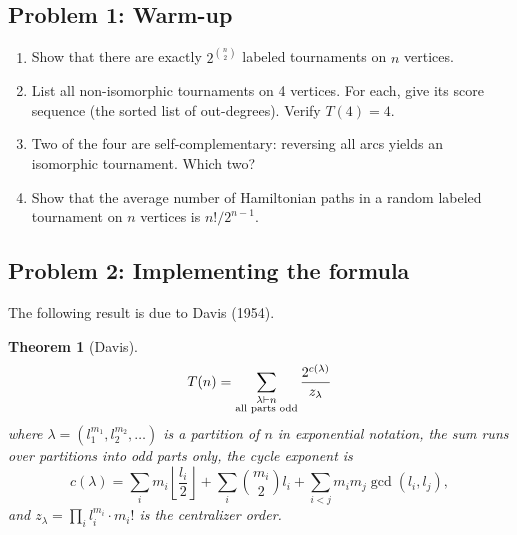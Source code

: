 \documentclass[11pt,letterpaper]{article}
\newtheorem{theorem}{Theorem}
\theoremstyle{definition}
\begin{document}
\subsection*{Problem 1: Warm-up \hfill \normalfont [15 points]}

\begin{enumerate}[label=(\alph*)]
  \item Show that there are exactly $2^{\binom{n}{2}}$ labeled tournaments on $n$ vertices.
  \item List all non-isomorphic tournaments on 4 vertices. For each, give its score sequence (the sorted list of out-degrees). Verify $T(4) = 4$.
  \item Two of the four are self-complementary: reversing all arcs yields an isomorphic tournament. Which two?
  \item Show that the average number of Hamiltonian paths in a random labeled tournament on $n$ vertices is $n!/2^{n-1}$.
\end{enumerate}

\bigskip


\subsection*{Problem 2: Implementing the formula \hfill \normalfont [25 points]}

The following result is due to Davis (1954).

\begin{theorem}[Davis]\label{thm:davis}
\begin{equation}\label{eq:davis}
T(n) = \sum_{\substack{\lambda \vdash n \\ \textup{all parts odd}}} \frac{2^{c(\lambda)}}{z_\lambda}
\end{equation}
where $\lambda = (l_1^{m_1}, l_2^{m_2}, \ldots)$ is a partition of $n$ in exponential notation, the sum runs over partitions into odd parts only, the cycle exponent is
\begin{equation}\label{eq:exponent}
c(\lambda) = \sum_i m_i \left\lfloor \frac{l_i}{2} \right\rfloor + \sum_i \binom{m_i}{2} l_i + \sum_{i < j} m_i m_j \gcd(l_i, l_j),
\end{equation}
and $z_\lambda = \prod_i l_i^{m_i} \cdot m_i!$ is the centralizer order.
\end{theorem}
\end{document}
